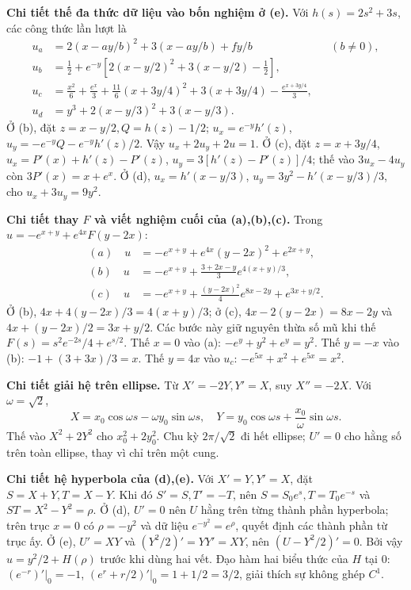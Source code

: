 \textbf{Chi tiết thế đa thức dữ liệu vào bốn nghiệm ở (e).} Với $h(s)=2s^2+3s$, các công thức lần lượt là
\[\begin{aligned}
u_a&=2(x-ay/b)^2+3(x-ay/b)+fy/b &&(b\ne0),\\
u_b&=\tfrac12+e^{-y}[2(x-y/2)^2+3(x-y/2)-\tfrac12],\\
u_c&=\frac{x^2}{6}+\frac{e^x}{3}+\frac{11}{6}(x+3y/4)^2+3(x+3y/4)-\frac{e^{x+3y/4}}3,\\
u_d&=y^3+2(x-y/3)^2+3(x-y/3).
\end{aligned}\]
Ở (b), đặt $z=x-y/2,Q=h(z)-1/2$; $u_x=e^{-y}h'(z)$, $u_y=-e^{-y}Q-e^{-y}h'(z)/2$. Vậy $u_x+2u_y+2u=1$. Ở (c), đặt $z=x+3y/4$, $u_x=P'(x)+h'(z)-P'(z)$, $u_y=3[h'(z)-P'(z)]/4$; thế vào $3u_x-4u_y$ còn $3P'(x)=x+e^x$. Ở (d), $u_x=h'(x-y/3)$, $u_y=3y^2-h'(x-y/3)/3$, cho $u_x+3u_y=9y^2$.

\textbf{Chi tiết thay $F$ và viết nghiệm cuối của (a),(b),(c).} Trong $u=-e^{x+y}+e^{4x}F(y-2x)$:
\[\begin{aligned}
(a)\quad u&=-e^{x+y}+e^{4x}(y-2x)^2+e^{2x+y},\\
(b)\quad u&=-e^{x+y}+\frac{3+2x-y}{3}e^{4(x+y)/3},\\
(c)\quad u&=-e^{x+y}+\frac{(y-2x)^2}{4}e^{8x-2y}+e^{3x+y/2}.
\end{aligned}\]
Ở (b), $4x+4(y-2x)/3=4(x+y)/3$; ở (c), $4x-2(y-2x)=8x-2y$ và $4x+(y-2x)/2=3x+y/2$. Các bước này giữ nguyên thừa số mũ khi thế $F(s)=s^2e^{-2s}/4+e^{s/2}$.
Thế $x=0$ vào (a): $-e^y+y^2+e^y=y^2$. Thế $y=-x$ vào (b): $-1+(3+3x)/3=x$. Thế $y=4x$ vào $u_c$: $-e^{5x}+x^2+e^{5x}=x^2$.

\textbf{Chi tiết giải hệ trên ellipse.} Từ $X'=-2Y,Y'=X$, suy $X''=-2X$. Với $\omega=\sqrt2$,
\[X=x_0\cos\omega s-\omega y_0\sin\omega s,\quad
Y=y_0\cos\omega s+\frac{x_0}{\omega}\sin\omega s.\]
Thế vào $X^2+2Y^2$ cho $x_0^2+2y_0^2$. Chu kỳ $2\pi/\sqrt2$ đi hết ellipse; $U'=0$ cho hằng số trên toàn ellipse, thay vì chỉ trên một cung.

\textbf{Chi tiết hệ hyperbola của (d),(e).} Với $X'=Y,Y'=X$, đặt $S=X+Y,T=X-Y$. Khi đó $S'=S,T'=-T$, nên $S=S_0e^s,T=T_0e^{-s}$ và $ST=X^2-Y^2=\rho$. Ở (d), $U'=0$ nên $U$ hằng trên từng thành phần hyperbola; trên trục $x=0$ có $\rho=-y^2$ và dữ liệu $e^{-y^2}=e^\rho$, quyết định các thành phần từ trục ấy. Ở (e), $U'=XY$ và $(Y^2/2)'=YY'=XY$, nên $(U-Y^2/2)'=0$. Bởi vậy $u=y^2/2+H(\rho)$ trước khi dùng hai vết. Đạo hàm hai biểu thức của $H$ tại $0$: $(e^{-r})'|_0=-1$, $(e^r+r/2)'|_0=1+1/2=3/2$, giải thích sự không ghép $C^1$.

